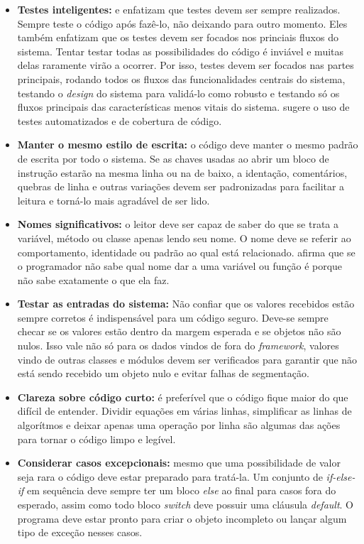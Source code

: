 \begin{itemize}
  \item \textbf{Testes inteligentes:} \cite{Goodliffe2007} e \cite{McConnel2004} enfatizam que testes devem ser sempre realizados. Sempre teste o código após fazê-lo, não deixando para outro momento. Eles também enfatizam que os testes devem ser focados nos princiais fluxos do sistema. Tentar testar todas as possibilidades do código é inviável e muitas delas raramente virão a ocorrer. Por isso, testes devem ser focados nas partes principais, rodando todos os fluxos das funcionalidades centrais do sistema, testando o \textit{design} do sistema para validá-lo como robusto e testando só os fluxos principais das características menos vitais do sistema. \cite{McConnel2004} sugere o uso de testes automatizados e de cobertura de código.
  \item \textbf{Manter o mesmo estilo de escrita:} o código deve manter o mesmo padrão de escrita por todo o sistema. Se as chaves usadas ao abrir um bloco de instrução estarão na mesma linha ou na de baixo, a identação, comentários, quebras de linha e outras variações devem ser padronizadas para facilitar a leitura e torná-lo mais agradável de ser lido.
  \item \textbf{Nomes significativos:} o leitor deve ser capaz de saber do que se trata a variável, método ou classe apenas lendo seu nome. O nome deve se referir ao comportamento, identidade ou padrão ao qual está relacionado. \cite{Goodliffe2007} afirma que se o programador não sabe qual nome dar a uma variável ou função é porque não sabe exatamente o que ela faz.
  \item \textbf{Testar as entradas do sistema:} Não confiar que os valores recebidos estão sempre corretos é indispensável para um código seguro. Deve-se sempre checar se os valores estão dentro da margem esperada e se objetos não são nulos. Isso vale não só para os dados vindos de fora do \textit{framework}, valores vindo de outras classes e módulos devem ser verificados para garantir que não está sendo recebido um objeto nulo e evitar falhas de segmentação.
  \item \textbf{Clareza sobre código curto:} é preferível que o código fique maior do que difícil de entender. Dividir equações em várias linhas, simplificar as linhas de algorítmos e deixar apenas uma operação por linha são algumas das ações para tornar o código limpo e legível.
  \item \textbf{Considerar casos excepcionais:} mesmo que uma possibilidade de valor seja rara o código deve estar preparado para tratá-la. Um conjunto de \textit{if-else-if} em sequência deve sempre ter um bloco \textit{else} ao final para casos fora do esperado, assim como todo bloco \textit{switch} deve possuir uma cláusula \textit{default}. O programa deve estar pronto para criar o objeto incompleto ou lançar algum tipo de exceção nesses casos.

\end{itemize}
